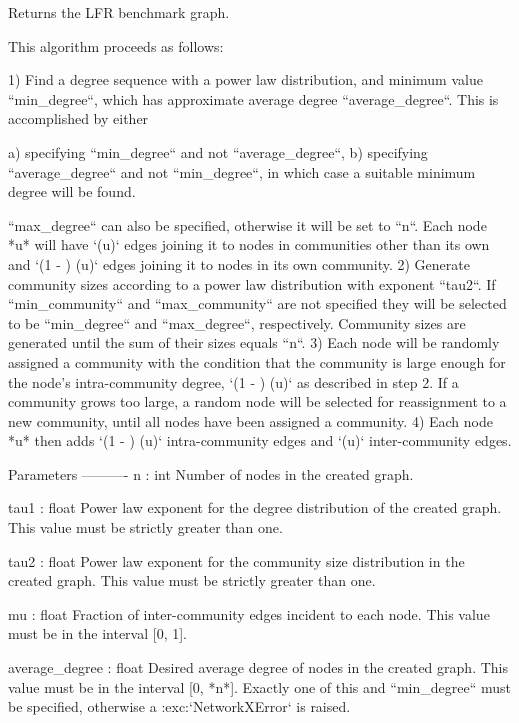 \begin{DoxyVerb}Returns the LFR benchmark graph.

This algorithm proceeds as follows:

1) Find a degree sequence with a power law distribution, and minimum
   value ``min_degree``, which has approximate average degree
   ``average_degree``. This is accomplished by either

   a) specifying ``min_degree`` and not ``average_degree``,
   b) specifying ``average_degree`` and not ``min_degree``, in which
      case a suitable minimum degree will be found.

   ``max_degree`` can also be specified, otherwise it will be set to
   ``n``. Each node *u* will have `\mu {}(u)` edges
   joining it to nodes in communities other than its own and `(1 -
   \mu) (u)` edges joining it to nodes in its own
   community.
2) Generate community sizes according to a power law distribution
   with exponent ``tau2``. If ``min_community`` and
   ``max_community`` are not specified they will be selected to be
   ``min_degree`` and ``max_degree``, respectively.  Community sizes
   are generated until the sum of their sizes equals ``n``.
3) Each node will be randomly assigned a community with the
   condition that the community is large enough for the node's
   intra-community degree, `(1 - \mu) (u)` as
   described in step 2. If a community grows too large, a random node
   will be selected for reassignment to a new community, until all
   nodes have been assigned a community.
4) Each node *u* then adds `(1 - \mu) (u)`
   intra-community edges and `\mu {}(u)` inter-community
   edges.

Parameters
----------
n : int
    Number of nodes in the created graph.

tau1 : float
    Power law exponent for the degree distribution of the created
    graph. This value must be strictly greater than one.

tau2 : float
    Power law exponent for the community size distribution in the
    created graph. This value must be strictly greater than one.

mu : float
    Fraction of inter-community edges incident to each node. This
    value must be in the interval [0, 1].

average_degree : float
    Desired average degree of nodes in the created graph. This value
    must be in the interval [0, *n*]. Exactly one of this and
    ``min_degree`` must be specified, otherwise a
    :exc:`NetworkXError` is raised.


\end{DoxyVerb}
